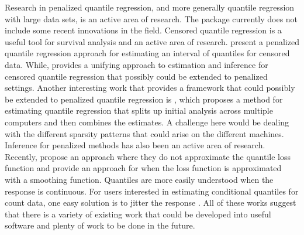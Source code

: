 Research in penalized quantile regression, and more generally quantile regression with large data sets, is an active area of research. The package currently does not include some recent innovations in the field. Censored quantile regression is a useful tool for survival analysis and an active area of research. \citet{hdCensQR} present a penalized quantile regression approach for estimating an interval of quantiles for censored data. While, \citet{effCenQR} provides a unifying approach to estimation and inference for censored quantile regression that possibly could be extended to penalized settings. Another interesting work that provides a framework that could possibly be extended to penalized quantile regression is \citet{qrDist}, which proposes a method for estimating quantile regression that splits up initial analysis across multiple computers and then combines the estimates. A challenge here would be dealing with the different sparsity patterns that could arise on the different machines. Inference for penalized methods has also been an active area of research. Recently, \citet{validQRInf} propose an approach where they do not approximate the quantile loss function and \citet{ciHypHDQR} provide an approach for when the loss function is approximated with a smoothing function. Quantiles are more easily understood when the response is continuous. For users interested in estimating conditional quantiles for count data, one easy solution is to jitter the response \citep{quantileCount}. All of these works suggest that there is a variety of existing work that could be developed into useful software and plenty of work to be done in the future.



\address{%
Ben Sherwood\\
University of Kansas\\%
School of Business\\ Lawrence, KS\\
%
%
%
\href{mailto:ben.sherwood@ku.edu}{\nolinkurl{ben.sherwood@ku.edu}}%
}

\address{%
Shaobo Li\\
University of Kansas\\%
School of Business\\ Lawrence, KS\\
%
%
%
\href{mailto:shaobo.li@ku.edu}{\nolinkurl{shaobo.li@ku.edu}}%
}

\address{%
Adam Maidman\\
University of Minnesota\\%
School of Statistics\\ Minneapolis, MN\\
%
%
%
\href{mailto:abmaidman@gmail.com}{\nolinkurl{abmaidman@gmail.com}}%
}
